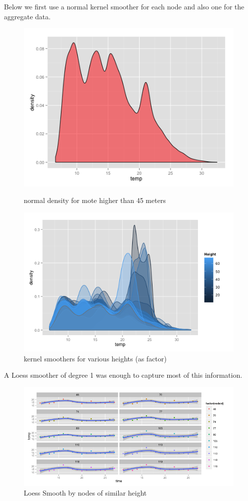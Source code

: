 \documentclass{article}\usepackage[]{graphicx}\usepackage[]{color}
\begin{document}
Below we first use a normal kernel smoother for each node and also one for the aggregate data. 
\begin{figure}[H]
\begin{minipage}{.5\textwidth}
\includegraphics[width=250pts, height=150pts]{Rplot02.png}
\caption{normal density for mote higher than 45 meters}
\end{minipage}
\begin{minipage}{.5\textwidth}
\includegraphics[width=250pts, height=150pts]{height_density.png}
\caption{kernel smoothers for various heights (as factor)}
\end{minipage}

\end{figure}

A Loess smoother of degree 1 was enough to capture most of this information.  

\begin{figure}[H]
\includegraphics[width=400pts, height=400pts]{loess_smooth.png}
\caption{Loess Smooth by nodes of similar height}


\end{figure}
\end{document}
